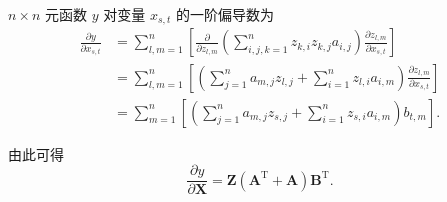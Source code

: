$n \times n$ 元函数 $y$ 对变量 $x_{s,t}$ 的一阶偏导数为
\begin{equation*}
\begin{aligned}
\frac{\partial y}{\partial x_{s,t}}
&= \sum_{l,m=1}^{n} \left[ \frac{\partial}{\partial z_{l,m}} \left( \sum_{i,j,k=1}^{n} z_{k,i} z_{k,j} a_{i,j} \right) \frac{\partial z_{l,m}}{\partial x_{s,t}} \right] \\
&= \sum_{l,m=1}^{n} \left[ \left( \sum_{j=1}^{n} a_{m,j} z_{l,j} + \sum_{i=1}^{n} z_{l,i} a_{i,m} \right) \frac{\partial z_{l,m}}{\partial x_{s,t}} \right] \\
&= \sum_{m=1}^{n} \left[ \left( \sum_{j=1}^{n} a_{m,j} z_{s,j} + \sum_{i=1}^{n} z_{s,i} a_{i,m} \right) b_{t,m} \right].
\end{aligned}
\end{equation*}

由此可得
\begin{equation*}
\boxed{\frac{\partial y}{\partial \boldsymbol{X}} = \boldsymbol{Z} \left( \boldsymbol{A}^{\mathrm{T}} + \boldsymbol{A} \right) \boldsymbol{B}^{\mathrm{T}}}.
\end{equation*}
